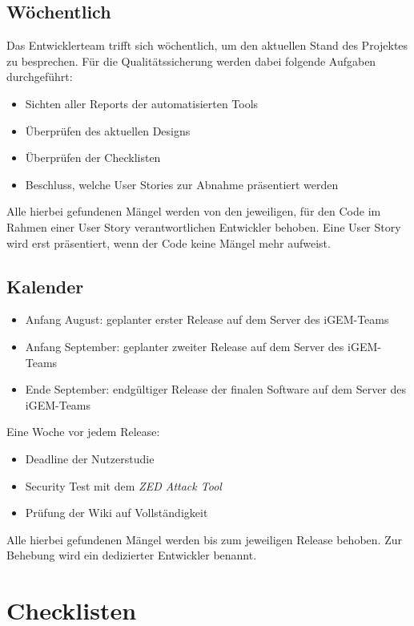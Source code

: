 \documentclass[accentcolor=tud0b,12pt,paper=a4]{tudreport}
\begin{document}
\subsection{Wöchentlich}
Das Entwicklerteam trifft sich wöchentlich, um den aktuellen Stand des Projektes zu besprechen. Für die Qualitätssicherung werden dabei folgende Aufgaben durchgeführt:
\begin{itemize}
	\item Sichten aller Reports der automatisierten Tools
	\item Überprüfen des aktuellen Designs
	\item Überprüfen der Checklisten
	\item Beschluss, welche User Stories zur Abnahme präsentiert werden
\end{itemize}

Alle hierbei gefundenen Mängel werden von den jeweiligen, für den Code im Rahmen einer User Story verantwortlichen Entwickler behoben. Eine User Story wird erst präsentiert, wenn der Code keine Mängel mehr aufweist.

\subsection{Kalender}
\begin{itemize}
	\item Anfang August: geplanter erster Release auf dem Server des iGEM-Teams
	\item Anfang September: geplanter zweiter Release auf dem Server des iGEM-Teams
	\item Ende September: endgültiger Release der finalen Software auf dem Server des iGEM-Teams
\end{itemize}
Eine Woche vor jedem Release:
\begin{itemize}
	\item Deadline der Nutzerstudie
	\item Security Test mit dem \emph{ZED Attack Tool}
	\item Prüfung der Wiki auf Vollständigkeit
\end{itemize}

Alle hierbei gefundenen Mängel werden bis zum jeweiligen Release behoben. Zur Behebung wird ein dedizierter Entwickler benannt.
\pagebreak

\section{Checklisten}
\end{document}
